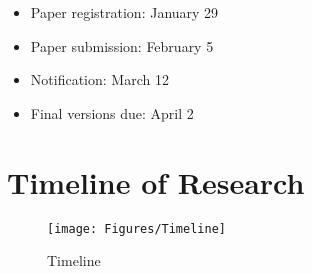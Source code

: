 \begin{itemize}
    \item Paper registration: January 29
    \item Paper submission: February 5
    \item Notification: March 12
    \item Final versions due: April 2
\end{itemize}

\section{Timeline of Research}

\begin{figure}[h]
    \centering
    \texttt{[image: Figures/Timeline]}
    \caption{Timeline}
    \label{fig:timeline}
\end{figure}
